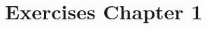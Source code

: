 
{
    \chapter{Exercises Chapter 1}
    \graphicspath{ {./Exercises-Chapter-1/images/} }
    
    
}
